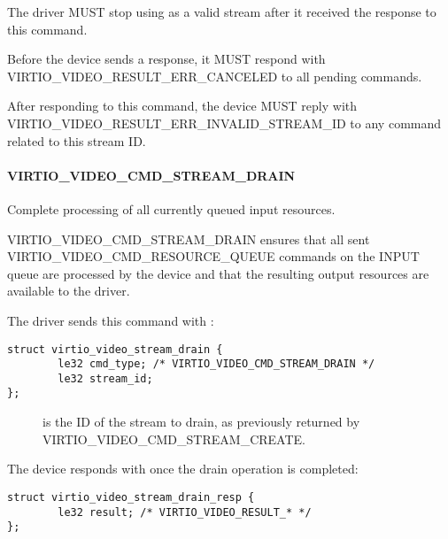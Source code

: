 The driver MUST stop using  as a valid stream after it
received the response to this command.


Before the device sends a response, it MUST respond with
VIRTIO_VIDEO_RESULT_ERR_CANCELED to all pending commands.

After responding to this command, the device MUST reply with
VIRTIO_VIDEO_RESULT_ERR_INVALID_STREAM_ID to any command related
to this stream ID.

\paragraph{VIRTIO_VIDEO_CMD_STREAM_DRAIN}\label{sec:Device Types / Video Device / Device Operation / Device Operation: Stream commands / VIRTIO_VIDEO_CMD_STREAM_DRAIN}

Complete processing of all currently queued input resources.

VIRTIO_VIDEO_CMD_STREAM_DRAIN ensures that all sent
VIRTIO_VIDEO_CMD_RESOURCE_QUEUE commands on the INPUT queue are
processed by the device and that the resulting output resources are
available to the driver.

The driver sends this command with
:

\begin{lstlisting}
struct virtio_video_stream_drain {
        le32 cmd_type; /* VIRTIO_VIDEO_CMD_STREAM_DRAIN */
        le32 stream_id;
};
\end{lstlisting}

\begin{description}
\item[]
is the ID of the stream to drain, as previously returned by
VIRTIO_VIDEO_CMD_STREAM_CREATE.
\end{description}

The device responds with 
once the drain operation is completed:

\begin{lstlisting}
struct virtio_video_stream_drain_resp {
        le32 result; /* VIRTIO_VIDEO_RESULT_* */
};
\end{lstlisting}

